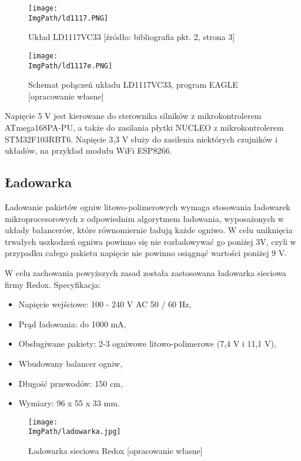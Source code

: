 \documentclass[a4paper,12pt,twoside,openany]{report}
\newcommand{\ImgPath}{.}
\begin{document}
\begin{figure}[!htbp]
	\begin{center}
\centering
\texttt{[image: \\ImgPath/ld1117.PNG]}
\end{center}
	\caption{Układ LD1117VC33 [źródło: bibliografia pkt. 2, strona 3]}
	\label{schematKomunikacji}
\end{figure}

\begin{figure}[!htbp]
	\begin{center}
\centering
\texttt{[image: \\ImgPath/ld1117e.PNG]}
\end{center}
	\caption{Schemat połączeń układu LD1117VC33, program EAGLE [opracowanie własne]}
	\label{schematKomunikacji}
\end{figure}

\newpage

Napięcie 5 V jest kierowane do sterownika silników z mikrokontrolerem ATmega168PA-PU, a także do zasilania płytki NUCLEO z mikrokontrolerem STM32F103RBT6. Napięcie 3,3 V służy do zasilenia niektórych czujników i układów, na przykład modułu WiFi ESP8266.

\subsection{Ładowarka}

Ładowanie pakietów ogniw litowo-polimerowych wymaga stosowania ładowarek mikroprocesorowych z odpowiednim algorytmem ładowania, wyposażonych w układy balancerów, które równomiernie ładują każde ogniwo. W celu uniknięcia trwałych uszkodzeń ogniwa powinno się nie rozładowywać go poniżej 3V, czyli w przypadku całego pakietu napięcie nie powinno osiągnąć wartości poniżej 9 V.

W celu zachowania powyższych zasad została zastosowana ładowarka sieciowa firmy Redox. Specyfikacja:
\begin{itemize}
\item Napięcie wejściowe: 100 - 240 V AC 50 / 60 Hz,
\item Prąd ładowania: do 1000 mA,
\item Obsługiwane pakiety: 2-3 ogniwowe litowo-polimerowe (7,4  V i 11,1 V),
\item Wbudowany balancer ogniw,
\item Długość przewodów: 150 cm,
\item Wymiary: 96 x 55 x 33 mm.
\end{itemize}

\begin{figure}[!htbp]
	\begin{center}
\centering
\texttt{[image: \\ImgPath/ladowarka.jpg]}
\end{center}
	\caption{Ładowarka sieciowa Redox [opracowanie własne]}
	\label{schematKomunikacji}
\end{figure}
\end{document}
